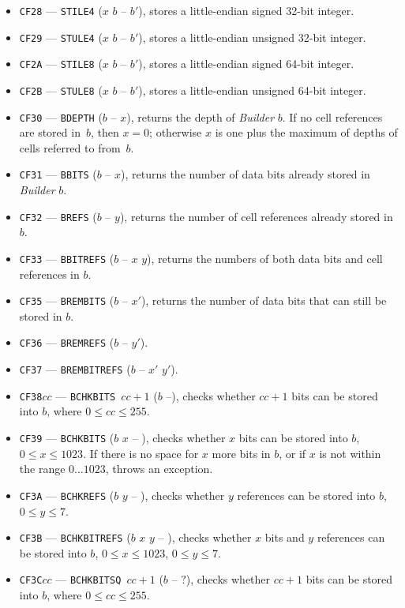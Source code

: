 \documentclass[12pt,oneside]{article}
\begin{document}
\begin{itemize}
\item {\tt CF28} --- {\tt STILE4} ($x$ $b$ -- $b'$), stores a little-endian signed 32-bit integer.
\item {\tt CF29} --- {\tt STULE4} ($x$ $b$ -- $b'$), stores a little-endian unsigned 32-bit integer.
\item {\tt CF2A} --- {\tt STILE8} ($x$ $b$ -- $b'$), stores a little-endian signed 64-bit integer.
\item {\tt CF2B} --- {\tt STULE8} ($x$ $b$ -- $b'$), stores a little-endian unsigned 64-bit integer.
\item {\tt CF30} --- {\tt BDEPTH} ($b$ -- $x$), returns the depth of {\em Builder\/} $b$. If no cell references are stored in~$b$, then $x=0$; otherwise $x$ is one plus the maximum of depths of cells referred to from~$b$.
\item {\tt CF31} --- {\tt BBITS} ($b$ -- $x$), returns the number of data bits already stored in {\em Builder\/} $b$.
\item {\tt CF32} --- {\tt BREFS} ($b$ -- $y$), returns the number of cell references already stored in $b$.
\item {\tt CF33} --- {\tt BBITREFS} ($b$ -- $x$ $y$), returns the numbers of both data bits and cell references in $b$.
\item {\tt CF35} --- {\tt BREMBITS} ($b$ -- $x'$), returns the number of data bits that can still be stored in $b$.
\item {\tt CF36} --- {\tt BREMREFS} ($b$ -- $y'$).
\item {\tt CF37} --- {\tt BREMBITREFS} ($b$ -- $x'$ $y'$).
\item {\tt CF38$cc$} --- {\tt BCHKBITS $cc+1$} ($b$ --), checks whether $cc+1$ bits can be stored into $b$, where $0\leq cc\leq 255$.
\item {\tt CF39} --- {\tt BCHKBITS} ($b$ $x$ -- ), checks whether $x$ bits can be stored into $b$, $0\leq x\leq 1023$. If there is no space for $x$ more bits in $b$, or if $x$ is not within the range $0\ldots1023$, throws an exception.
\item {\tt CF3A} --- {\tt BCHKREFS} ($b$ $y$ -- ), checks whether $y$ references can be stored into $b$, $0\leq y\leq 7$.
\item {\tt CF3B} --- {\tt BCHKBITREFS} ($b$ $x$ $y$ -- ), checks whether $x$ bits and $y$ references can be stored into $b$, $0\leq x\leq 1023$, $0\leq y\leq 7$.
\item {\tt CF3C$cc$} --- {\tt BCHKBITSQ $cc+1$} ($b$ -- $?$), checks whether $cc+1$ bits can be stored into $b$, where $0\leq cc\leq 255$.

\end{itemize}
\end{document}
